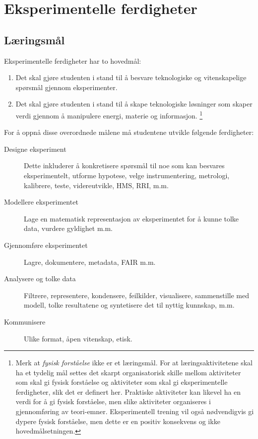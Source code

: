 \section{Eksperimentelle ferdigheter}

\subsection{Læringsmål}

Eksperimentelle ferdigheter har to hovedmål:
\begin{enumerate}
	\item Det skal gjøre studenten i stand til å besvare teknologiske og vitenskapelige spørsmål gjennom eksperimenter. 
	\item  Det skal gjøre studenten i stand til å skape teknologiske løsninger som skaper verdi gjennom å manipulere energi, materie og informasjon. \footnote{Merk at \emph{fysisk forståelse} ikke er et læringsmål. For at læringsaktivitetene skal ha et tydelig mål settes det skarpt organisatorisk skille mellom aktiviteter som skal gi fysisk forståelse og aktiviteter som skal gi eksperimentelle ferdigheter, slik det er definert her. Praktiske aktiviteter kan likevel ha en verdi for å gi fysisk forståelse, men slike aktiviteter organiseres i gjennomføring av teori-emner. Eksperimentell trening vil også nødvendigvis gi dypere fysisk forståelse, men dette er en positiv konsekvens og ikke hovedmålsetningen.}
\end{enumerate}

For å oppnå disse overordnede målene må studentene utvikle følgende ferdigheter:

\begin{description}
	\item [Designe eksperiment] Dette inkluderer å konkretisere spørsmål til noe som kan besvares eksperimentelt, utforme hypotese, velge instrumentering, metrologi, kalibrere, teste, videreutvikle, HMS, RRI, m.m.
	\item [Modellere eksperimentet] Lage en matematisk representasjon av eksperimentet for å kunne tolke data, vurdere gyldighet m.m.
	\item [Gjennomføre eksperimentet] Lagre, dokumentere, metadata, FAIR m.m.
	\item [Analysere og tolke data] Filtrere, representere, kondensere, feilkilder, visualisere, sammenstille med modell, tolke resultatene og syntetisere det til nyttig kunnskap, m.m.
	\item [Kommunisere] Ulike format, åpen vitenskap, etisk.
\end{description}

